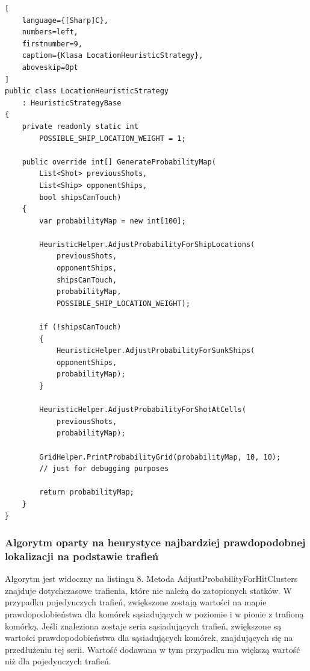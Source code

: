 \begin{addmargin}[10mm]{0mm}
\begin{lstlisting}[
    language={[Sharp]C},
    numbers=left,
    firstnumber=9,
    caption={Klasa LocationHeuristicStrategy},
    aboveskip=0pt
]
public class LocationHeuristicStrategy
    : HeuristicStrategyBase
{
    private readonly static int
        POSSIBLE_SHIP_LOCATION_WEIGHT = 1;

    public override int[] GenerateProbabilityMap(
        List<Shot> previousShots,
        List<Ship> opponentShips,
        bool shipsCanTouch)
    {
        var probabilityMap = new int[100];

        HeuristicHelper.AdjustProbabilityForShipLocations(
            previousShots,
            opponentShips,
            shipsCanTouch,
            probabilityMap,
            POSSIBLE_SHIP_LOCATION_WEIGHT);

        if (!shipsCanTouch)
        {
            HeuristicHelper.AdjustProbabilityForSunkShips(
            opponentShips,
            probabilityMap);
        }

        HeuristicHelper.AdjustProbabilityForShotAtCells(
            previousShots,
            probabilityMap);

        GridHelper.PrintProbabilityGrid(probabilityMap, 10, 10);
        // just for debugging purposes

        return probabilityMap;
    }
}

\end{lstlisting}
\end{addmargin}

\subsubsection{Algorytm oparty na heurystyce najbardziej prawdopodobnej lokalizacji na podstawie trafień}
Algorytm jest widoczny na listingu 8. Metoda AdjustProbabilityForHitClusters znajduje dotychczasowe trafienia, które nie należą do zatopionych statków. W przypadku pojedynczych trafień, zwiększone zostają wartości na mapie prawdopodobieństwa dla komórek sąsiadujących w poziomie i w pionie z trafioną komórką. Jeśli znaleziona zostaje seria sąsiadujących trafień, zwiększone są wartości prawdopodobieństwa dla sąsiadujących komórek, znajdujących się na przedłużeniu tej serii. Wartość dodawana w tym przypadku ma większą wartość niż dla pojedynczych trafień.


